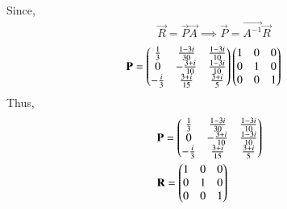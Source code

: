\documentclass[journal,12pt,twocolumn]{IEEEtran}
\begin{document}
Since,
\begin{align}
    & \vec{R}=\vec{P}\vec{A}
    \implies \vec{P}=\vec{A^{-1}}\vec{R}
\end{align}
\begin{align}
&\mathbf{P}= \begin{pmatrix} \frac{1}{3}&\frac{1-3i}{30}&\frac{1-3i}{10}\\0 & -\frac{3+i}{10}&\frac{1-3i}{10} \\
                        -\frac{i}{3} & \frac{3+i}{15} & \frac{3+i}{5}\end{pmatrix} \begin{pmatrix}1&0&0\\0&1&0\\0&0&1\end{pmatrix}
\end{align}
Thus,
\begin{align}
& \mathbf{P}= \begin{pmatrix} \frac{1}{3}&\frac{1-3i}{30}&\frac{1-3i}{10}\\0 & -\frac{3+i}{10}&\frac{1-3i}{10} \\
                        -\frac{i}{3} & \frac{3+i}{15} & \frac{3+i}{5}\end{pmatrix}\nonumber\\
& \mathbf{R}=\begin{pmatrix}1&0&0\\0&1&0\\0&0&1\end{pmatrix}\nonumber
\end{align}
\end{document}
